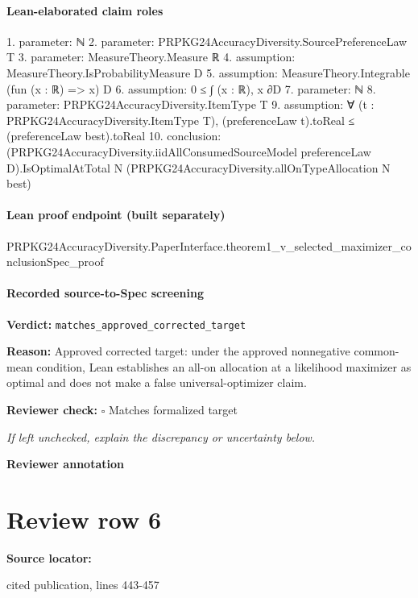 \documentclass[10pt]{article}
\newcommand{\reviewerbox}{%
  \par\noindent\fbox{\parbox{0.96\linewidth}{\rule{0pt}{0.38in}}}\par
}
\newcommand{\reviewmatch}[1]{%
  \par\noindent\textbf{Reviewer check:} $\square$\; #1\par
  \noindent\emph{If left unchecked, explain the discrepancy or uncertainty below.}\par
}
\begin{document}
\paragraph{Lean-elaborated claim roles}\begin{ReviewVerbatim}
1. parameter: ℕ
2. parameter: PRPKG24AccuracyDiversity.SourcePreferenceLaw T
3. parameter: MeasureTheory.Measure ℝ
4. assumption: MeasureTheory.IsProbabilityMeasure D
5. assumption: MeasureTheory.Integrable (fun (x : ℝ) => x) D
6. assumption: 0 ≤ ∫ (x : ℝ), x ∂D
7. parameter: ℕ
8. parameter: PRPKG24AccuracyDiversity.ItemType T
9. assumption: ∀ (t : PRPKG24AccuracyDiversity.ItemType T), (preferenceLaw t).toReal ≤ (preferenceLaw best).toReal
10. conclusion: (PRPKG24AccuracyDiversity.iidAllConsumedSourceModel preferenceLaw D).IsOptimalAtTotal N
  (PRPKG24AccuracyDiversity.allOnTypeAllocation N best)
\end{ReviewVerbatim}

\paragraph{Lean proof endpoint (built separately)}\begin{ReviewVerbatim}
PRPKG24AccuracyDiversity.PaperInterface.theorem1_v_selected_maximizer_conclusionSpec_proof
\end{ReviewVerbatim}

\paragraph{Recorded source-to-Spec screening}
\textbf{Verdict:} \texttt{matches\_approved\_corrected\_target}
\\
{\raggedright
\textbf{Reason:} Approved corrected target:\allowbreak{} under the approved nonnegative common-\allowbreak{}mean condition, Lean establishes an all-\allowbreak{}on allocation at a likelihood maximizer as optimal and does not make a false universal-\allowbreak{}optimizer claim.\allowbreak{}
\par}
\reviewmatch{Matches formalized target}
\noindent\textbf{Reviewer annotation}\par
\reviewerbox
\clearpage
\hypertarget{source-claim-e7ae4618a91038ee}{}
\section*{Review row 6}
\textbf{Source locator:} {\footnotesize\raggedright cited publication, lines 443-\allowbreak{}457\par}
\end{document}
